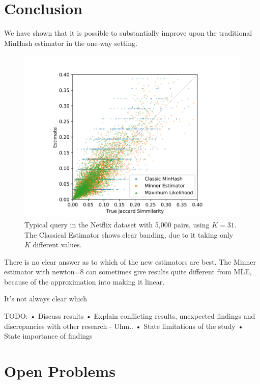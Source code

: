 
\section{Conclusion}

We have shown that it is possible to substantially improve upon the traditional MinHash estimator in the one-way setting.

\begin{figure}
   \centering
   \includegraphics[trim=10 0 10 30,clip,width=\linewidth]{figures/scatter}
   \caption{Typical query in the Netflix dataset with 5,000 pairs, using $K=31$.
      The Classical Estimator shows clear banding, due to it taking only $K$ different values.
   }
   \label{fig:scatter}
\end{figure}

There is no clear answer as to which of the new estimators are best.
The Minner estimator with newton=8 can sometimes give results quite different from MLE, because of the approximation into making it linear.

It's not always clear which 

TODO:
• Discuss results
• Explain conflicting results, unexpected findings and discrepancies with other research
   - Uhm..
• State limitations of the study
• State importance of findings

\section{Open Problems}

